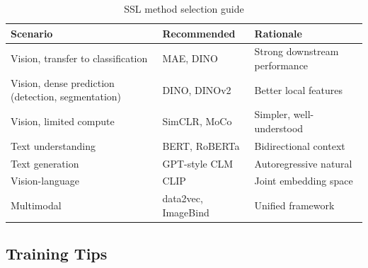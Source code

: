 \begin{table}[H]
\centering
\caption{SSL method selection guide}
\begin{tabularx}{\textwidth}{lXX}
\toprule
\textbf{Scenario} & \textbf{Recommended} & \textbf{Rationale} \\
\midrule
Vision, transfer to classification & MAE, DINO & Strong downstream performance \\
Vision, dense prediction (detection, segmentation) & DINO, DINOv2 & Better local features \\
Vision, limited compute & SimCLR, MoCo & Simpler, well-understood \\
Text understanding & BERT, RoBERTa & Bidirectional context \\
Text generation & GPT-style CLM & Autoregressive natural \\
Vision-language & CLIP & Joint embedding space \\
Multimodal & data2vec, ImageBind & Unified framework \\
\bottomrule
\end{tabularx}
\end{table}

\subsection{Training Tips}

